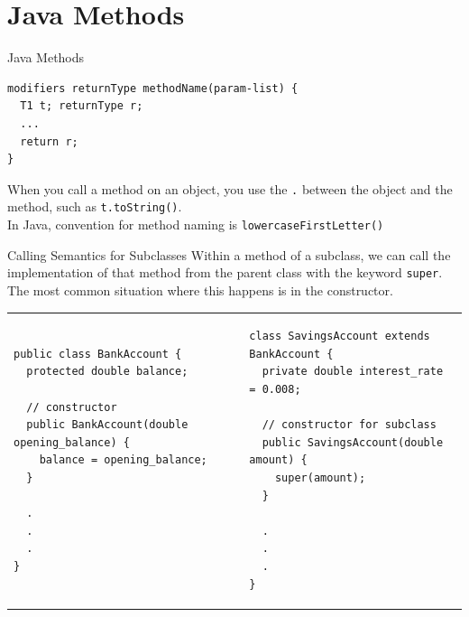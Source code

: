 \documentclass{beamer}
\makeatletter
\newenvironment{splitslide}
{
\centering
\begin{tabular}{@{}p{0.50\textwidth} | p{0.025\textwidth}@{} p{0.4\textwidth}@{}}
}
{
\end{tabular}
}
\makeatother
\begin{document}
\section{Java Methods}



\begin{frame}[fragile]{Java Methods}
\begin{verbatim}
modifiers returnType methodName(param-list) {
  T1 t; returnType r;
  ...
  return r;
}
\end{verbatim}

When you call a method on an object, you use the \texttt{.} between the object and the method, such as \texttt{t.toString()}. \\
\vspace{0.5em}
In Java, convention for method naming is {\tt lowercaseFirstLetter()}

\end{frame}



\begin{frame}[fragile]{Calling Semantics for Subclasses}
Within a method of a subclass, we can call the implementation of that method from the parent class with the keyword \texttt{super}. \\
\vspace{1em}
The most common situation where this happens is in the constructor. \\
\vspace{1em}
\begin{splitslide}

\begin{Verbatim}[fontsize=\tiny]
public class BankAccount {
  protected double balance;
  
  // constructor
  public BankAccount(double opening_balance) {
    balance = opening_balance;
  }
    
  .
  .
  .
}
\end{Verbatim}

&&

\begin{Verbatim}[fontsize=\tiny]
class SavingsAccount extends BankAccount {
  private double interest_rate = 0.008;
  
  // constructor for subclass
  public SavingsAccount(double amount) {
    super(amount);  
  }
  
  .
  .
  .
}
\end{Verbatim}

\end{splitslide}

\end{frame}
\end{document}
